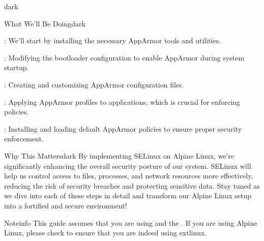 \begin{baseBoxThree}{}{dark}
    \smallskip
    \begin{baseBoxThree}{What We'll Be Doing}{dark}
        \smallskip
        \begin{posnexItemize}
            \item[\sA] : We'll start by installing the necessary AppArmor tools and utilities.
            \item[\sA] : Modifying the bootloader configuration to enable AppArmor during system startup.
            \item[\sA] : Creating and customizing AppArmor configuration files.
            \item[\sA] : Applying AppArmor profiles to applications, which is crucial for enforcing policies.
            \item[\sA] : Installing and loading default AppArmor policies to ensure proper security enforcement.
        \end{posnexItemize}
        \smallskip
        \begin{baseBoxThree}{Why This Matters}{dark}
            \smallskip
            By implementing SELinux on Alpine Linux, we're significantly enhancing the overall security posture of our system. SELinux will help us control access to files, processes, and network resources more effectively, reducing the risk of security breaches and protecting sensitive data.
            Stay tuned as we dive into each of these steps in detail and transform our Alpine Linux setup into a fortified and secure environment!
            \smallskip
        \end{baseBoxThree}
        \smallskip
    \end{baseBoxThree}
    \smallskip
    \begin{baseBoxThree}{Note}{info}
        \smallskip
        This guide assumes that you are using  and the . If you are using Alpine Linux, please check to ensure that you are indeed using extlinux.
        \smallskip
    \end{baseBoxThree}
        \smallskip
\end{baseBoxThree}

